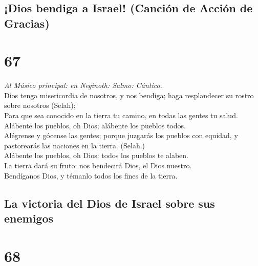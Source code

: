 \hypertarget{dios-bendiga-a-israel-canciuxf3n-de-acciuxf3n-de-gracias}{%
\subsection{¡Dios bendiga a Israel! (Canción de Acción de
Gracias)}\label{dios-bendiga-a-israel-canciuxf3n-de-acciuxf3n-de-gracias}}

\hypertarget{section-66}{%
\section{67}\label{section-66}}

 \emph{Al Músico principal: en Neginoth: Salmo: Cántico.}\\
Dios tenga misericordia de nosotros, y nos bendiga; haga resplandecer su
rostro sobre nosotros (Selah);\\
 Para que sea conocido en la tierra tu camino, en todas las
gentes tu salud.\\
 Alábente los pueblos, oh Dios; alábente los pueblos
todos.\\
 Alégrense y gócense las gentes; porque juzgarás los pueblos
con equidad, y pastorearás las naciones en la tierra. (Selah.)\\
 Alábente los pueblos, oh Dios: todos los pueblos te
alaben.\\
 La tierra dará su fruto: nos bendecirá Dios, el Dios
nuestro.\\
 Bendíganos Dios, y témanlo todos los fines de la tierra.

\hypertarget{la-victoria-del-dios-de-israel-sobre-sus-enemigos}{%
\subsection{La victoria del Dios de Israel sobre sus
enemigos}\label{la-victoria-del-dios-de-israel-sobre-sus-enemigos}}

\hypertarget{section-67}{%
\section{68}\label{section-67}}

